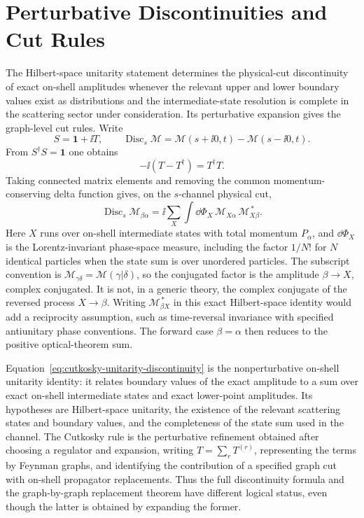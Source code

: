 \section{Perturbative Discontinuities and Cut Rules}

The Hilbert-space unitarity statement determines the physical-cut
discontinuity of exact on-shell amplitudes whenever the relevant upper and
lower boundary values exist as distributions and the intermediate-state
resolution is complete in the scattering sector under consideration.  Its
perturbative expansion gives the graph-level cut rules.  Write
\[
  S=\mathbf 1+\ii T,
  \qquad
  \operatorname{Disc}_s\mathcal M
  =
  \mathcal M(s+\ii0,t)-\mathcal M(s-\ii0,t).
\]
From \(S^\dagger S=\mathbf 1\) one obtains
\[
  -\ii(T-T^\dagger)=T^\dagger T .
\]
Taking connected matrix elements and removing the common momentum-conserving
delta function gives, on the \(s\)-channel physical cut,
\begin{equation}
  \operatorname{Disc}_s\mathcal M_{\beta\alpha}
  =
  \ii
  \sum_X
  \int \dd\Phi_X\,
  \mathcal M_{X\alpha}\,
  \mathcal M_{X\beta}^{\,*}.
  \label{eq:cutkosky-unitarity-discontinuity}
\end{equation}
Here \(X\) runs over on-shell intermediate states with total momentum
\(P_\alpha\), and \(\dd\Phi_X\) is the Lorentz-invariant phase-space measure,
including the factor \(1/N!\) for \(N\) identical particles when the state sum is
over unordered particles.  The subscript convention is
\(\mathcal M_{\gamma\delta}=\mathcal M(\gamma|\delta)\), so the conjugated
factor is the amplitude \(\beta\to X\), complex conjugated.  It is not, in a
generic theory, the complex conjugate of the reversed process \(X\to\beta\).
Writing \(\mathcal M_{\beta X}^{\,*}\) in this exact Hilbert-space identity
would add a reciprocity assumption, such as time-reversal invariance with
specified antiunitary phase conventions.  The forward case \(\beta=\alpha\)
then reduces to the positive optical-theorem sum.

\begin{remark}
\label{rem:unitarity-discontinuity-versus-cutkosky}
Equation~\eqref{eq:cutkosky-unitarity-discontinuity} is the
nonperturbative on-shell unitarity identity: it relates boundary values of the
exact amplitude to a sum over exact on-shell intermediate states and exact
lower-point amplitudes.  Its hypotheses are Hilbert-space unitarity, the
existence of the relevant scattering states and boundary values, and the
completeness of the state sum used in the channel.  The Cutkosky rule is the
perturbative refinement obtained after choosing a regulator and expansion,
writing \(T=\sum_r T^{(r)}\), representing the terms by Feynman graphs, and
identifying the contribution of a specified graph cut with on-shell
propagator replacements.  Thus the full discontinuity formula and the
graph-by-graph replacement theorem have different logical status, even though
the latter is obtained by expanding the former.
\end{remark}

